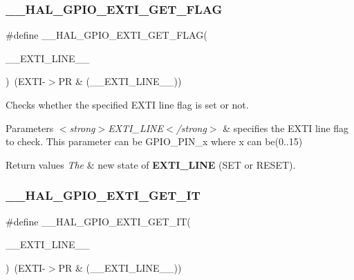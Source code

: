 \subsubsection{\texorpdfstring{\+\_\+\+\_\+\+H\+A\+L\+\_\+\+G\+P\+I\+O\+\_\+\+E\+X\+T\+I\+\_\+\+G\+E\+T\+\_\+\+F\+L\+AG}{\_\_HAL\_GPIO\_EXTI\_GET\_FLAG}}
{\footnotesize\ttfamily \#define \+\_\+\+\_\+\+H\+A\+L\+\_\+\+G\+P\+I\+O\+\_\+\+E\+X\+T\+I\+\_\+\+G\+E\+T\+\_\+\+F\+L\+AG(\begin{DoxyParamCaption}\item[{}]{\+\_\+\+\_\+\+E\+X\+T\+I\+\_\+\+L\+I\+N\+E\+\_\+\+\_\+ }\end{DoxyParamCaption})~(E\+X\+TI-\/$>$PR \& (\+\_\+\+\_\+\+E\+X\+T\+I\+\_\+\+L\+I\+N\+E\+\_\+\+\_\+))}



Checks whether the specified E\+X\+TI line flag is set or not. 


\begin{DoxyParams}{Parameters}
{\em $<$strong$>$\+E\+X\+T\+I\+\_\+\+L\+I\+N\+E$<$/strong$>$} & specifies the E\+X\+TI line flag to check. This parameter can be G\+P\+I\+O\+\_\+\+P\+I\+N\+\_\+x where x can be(0..15) \\
\hline
\end{DoxyParams}

\begin{DoxyRetVals}{Return values}
{\em The} & new state of {\bfseries E\+X\+T\+I\+\_\+\+L\+I\+NE} (S\+ET or R\+E\+S\+ET). \\
\hline
\end{DoxyRetVals}
\mbox{\label{group___g_p_i_o___exported___macros_ga27f0e1f6c38745169d74620f6a178a94}} 
\subsubsection{\texorpdfstring{\+\_\+\+\_\+\+H\+A\+L\+\_\+\+G\+P\+I\+O\+\_\+\+E\+X\+T\+I\+\_\+\+G\+E\+T\+\_\+\+IT}{\_\_HAL\_GPIO\_EXTI\_GET\_IT}}
{\footnotesize\ttfamily \#define \+\_\+\+\_\+\+H\+A\+L\+\_\+\+G\+P\+I\+O\+\_\+\+E\+X\+T\+I\+\_\+\+G\+E\+T\+\_\+\+IT(\begin{DoxyParamCaption}\item[{}]{\+\_\+\+\_\+\+E\+X\+T\+I\+\_\+\+L\+I\+N\+E\+\_\+\+\_\+ }\end{DoxyParamCaption})~(E\+X\+TI-\/$>$PR \& (\+\_\+\+\_\+\+E\+X\+T\+I\+\_\+\+L\+I\+N\+E\+\_\+\+\_\+))}



